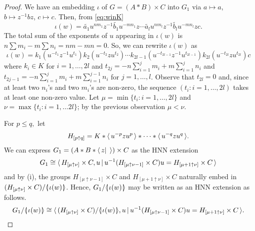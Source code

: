 \documentclass[12pt, a4paper]{amsart}
\theoremstyle{remark}
\theoremstyle{definition}
\begin{document}
\begin{proof}
We have an embedding $\iota$ of $G=(A*B)\times C$ into $G_1$ via $a\mapsto a$, $b\mapsto z^{-1}bz$, $c\mapsto c$.
Then, from \eqref{eq:winK} $$\iota(w)= \tilde{a_1}u^{nm_1} z^{-1}\tilde{b_1}u^{-mn_1}z\cdots  \tilde{a_l}u^{nm_l} z^{-1}\tilde{b_l}u^{-mn_l}zc.$$
 The total sum of the exponents of $u$ appearing in $\iota(w)$ is $n\sum m_i-m\sum {n_i}=nm-mn=0$. So, we can rewrite $\iota(w)$ as 
$$\iota(w)= k_1(u^{-t_1}z^{-1}u^{t_1})k_2(u^{-t_2}zu^{t_2}) \cdots k_{2l-1} (u^{-t_{2l-1}}z^{-1}u^{t_{2l-1}})k_{2l}(u^{-t_{2l}}zu^{t_{2l}})c$$
where $k_i\in K$ for $i=1,\dots, 2l$ and $t_{2j}=-n\sum_{i=1}^j m_i+m\sum_{i=1}^j n_{i}$ and $t_{2j-1}=-n\sum_{i=1}^j m_i+m\sum_{i=1}^{j-1} n_{i}$ for $j=1,\dots, l$. Observe that $t_{2l}=0$ and, since at least two $n_i$'s and two $m_i$'s are non-zero, the sequence $(t_i:i=1,\dots, 2l)$  takes at least one non-zero value. Let $\mu=\min \{ t_i : i=1,\dots, 2l\}$ and $\nu=\max\{t_i:i=1,\dots 2l\}$; by the previous observation $\mu<\nu$.

For $p\leq q,$ let $$H_{[p\uparrow q]}=K*{\langle\mkern3mu{u^{{-p}}zu^{{p}}}\mkern3mu\rangle}*\dots *{\langle\mkern3mu{u^{{-q}}zu^{q}}\mkern3mu\rangle}.$$
We can express $G_1= (A*B*{\langle\mkern3mu{z|\;}\mkern3mu\rangle})\times C$ as the HNN extension
\begin{equation}
G_1\cong {\langle\mkern3mu{ H_{[\mu\uparrow \nu]}\times C, u \,|\, u^{-1}(H_{[\mu \uparrow \nu-1]} \times C)u= H_{[\mu+1 \uparrow \nu]}\times C}\mkern3mu\rangle}
\end{equation}
and by (i), the groups $H_{[\mu \uparrow \nu-1]} \times C$ and  $H_{[\mu+1 \uparrow \nu]}\times C$ naturally embed in $(H_{[\mu\uparrow \nu]}\times C)/{{\langle}{\mkern-3.7mu}{\lvert}{\mkern1.2mu}{{\iota(w)}}{\mkern1.2mu}{\rvert}{\mkern-3.7mu}{\rangle}}$. Hence, $G_1/{{\langle}{\mkern-3.7mu}{\lvert}{\mkern1.2mu}{{\iota(w)}}{\mkern1.2mu}{\rvert}{\mkern-3.7mu}{\rangle}}$ may be written as an HNN extension as follows. 
\begin{equation}\label{eq:HNN22}
G_1/{{\langle}{\mkern-3.7mu}{\lvert}{\mkern1.2mu}{{\iota(w)}}{\mkern1.2mu}{\rvert}{\mkern-3.7mu}{\rangle}}\cong {\langle\mkern3mu{ (H_{[\mu\uparrow \nu]}\times C)/{{\langle}{\mkern-3.7mu}{\lvert}{\mkern1.2mu}{{\iota(w)}}{\mkern1.2mu}{\rvert}{\mkern-3.7mu}{\rangle}}, u \,|\, u^{-1}(H_{[\mu \uparrow \nu-1]} \times C)u= H_{[\mu+1 \uparrow \nu]}\times C}\mkern3mu\rangle}.
\end{equation}


\end{proof}
\end{document}

